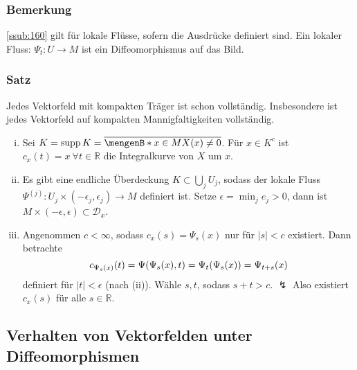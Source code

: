 \subsubsection{Bemerkung}
\label{ssub:161}
\ref{ssub:160} gilt für lokale Flüsse, sofern die Ausdrücke definiert sind. Ein lokaler Fluss: $\Psi_t:U\to M$ ist ein Diffeomorphismus auf das Bild.

\subsubsection{Satz}
\label{ssub:162}
Jedes Vektorfeld mit kompakten Träger ist schon vollständig. Insbesondere ist jedes Vektorfeld auf kompakten Mannigfaltigkeiten vollständig.
\begin{enumerate}[(i)]
\item 
{}
Sei $K = \supp K = \overline{\set[x\in M]{X(x)\neq 0}}$. Für $x\in K^c$ ist $c_x(t) = x\ \forall t\in \mathds{R}$ die Integralkurve von $X$ um $x$.
\item Es gibt eine endliche Überdeckung $K\subset \bigcup_j U_j$, sodass der lokale Fluss $\Psi^{(j)}: U_j\times (-\epsilon_j,\epsilon_j) \to M$ definiert ist. Setze $\epsilon = \min_j e_j > 0$, dann ist $M\times (-\epsilon,\epsilon)\subset \mathcal{D}_x$.
\item Angenommen $c < \infty$, sodass $c_x(s) = \Psi_s (x)$ nur für $|s| < c$ existiert. Dann betrachte
\[
c_{\Psi_s(x)} (t) = \Psi(\Psi_s (x), t) = \Psi_t(\Psi_s(x)) =\Psi_{t+s} (x)
\]
definiert für $|t| < \epsilon$ (nach (ii)). Wähle $s, t$, sodass $s+t > c$. $\lightning$ Also existiert $c_x(s)$ für alle $s\in \mathds{R}$.
\end{enumerate}

\subsection{Verhalten von Vektorfelden unter Diffeomorphismen}
\label{sub:19}

